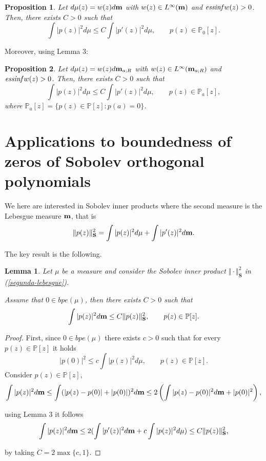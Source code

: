 \documentclass[12pt]{amsart}
\theoremstyle{definition}
\theoremstyle{plain}
\newtheorem{lem}{Lemma}
\newtheorem{prop}{Proposition}
\theoremstyle{remark}
\begin{document}
\begin{prop} Let $d\mu(z)=w(z)d{\bf m}$ with $w(z)\in L^{\infty}({\bf m})$ and ${\it ess inf} w(z)>0$. Then, there exists $C>0$ such that 
$$
\int \vert p(z) \vert^{2} d\mu \leq C\int \vert p'(z) \vert^{2} d\mu, \qquad p(z) \in \mathbb{P}_0[z].
$$
\end{prop}

\noindent Moreover, using Lemma 3: 
\begin{prop} Let $d\mu(z)=w(z)d{\bf m}_{a;R}$ with $w(z)\in L^{\infty}({\bf m}_{a;R})$ and ${\it ess inf} w(z)>0$. Then, there exists $C>0$ such that 
$$
\int \vert p(z) \vert^{2} d\mu \leq C\int \vert p'(z) \vert^{2} d\mu, \qquad p(z) \in \mathbb{P}_a[z],
$$
\noindent where $\mathbb{P}_a[z]=\{p(z)\in \mathbb{P}[z]: p(a)=0\}$.
\end{prop}

\section{Applications to boundedness of zeros of Sobolev orthogonal polynomials} 

\noindent  We here are interested in Sobolev inner products where the second measure is the Lebesgue measure ${\bf m}$, that is 
\begin{equation} \label{segunda-lebesgue}
\Vert p(z) \Vert_{\mathbf{S}}^{2} = \int \vert p(z) \vert^{2} d\mu +  \int \vert p'(z) \vert^{2} d{\bf m}.
\end{equation}

\noindent The key result is the following. 

\begin{lem} Let $\mu$ be a measure and consider the Sobolev inner product 
$
\Vert \cdot \Vert^{2}_{\mathbf{S}}$ in (\ref{segunda-lebesgue}).


\noindent  Assume that $0\in bpe(\mu)$, then there exists  $C>0$ such that 
$$
\int \vert p(z) \vert^{2} d{\bf m} \leq C \Vert p(z) \Vert_{\mathbf{S}}^{2}, \qquad p(z) \in \mathbb{P}[z].
$$
\end{lem}
\begin{proof} First, since $0\in bpe(\mu)$  there exists  $c>0$ such that for every $p(z)\in \mathbb{P}[z]$ it holds
$$
\vert p(0)\vert^{2} \leq c \int \vert p(z)\vert^{2} d\mu, \qquad p(z) \in \mathbb{P}[z].
$$
\noindent  Consider $p(z)\in \mathbb{P}[z]$, 
$$
\int \vert p(z) \vert^{2} d{\bf m} \leq \int (\vert p(z) -p(0) \vert+ \vert p(0) \vert)^{2}d{\bf m} \leq 2 \left( \int \vert p(z) -p(0) \vert^{2} d{\bf m} + \vert p(0) \vert^2\right) ,
$$

\noindent using  Lemma 3 it follows
$$ \int \vert p(z) \vert^{2} d{\bf m} \leq 
2(\int \vert p'(z) \vert^{2}d{\bf m}+ c\int \vert p(z) \vert^{2}d\mu) \leq C \Vert p(z) \Vert^{2}_{\mathbf{S}},
$$


\noindent  by  taking $C= 2\max \{c,1\}.$ 

\end{proof}
\end{document}
